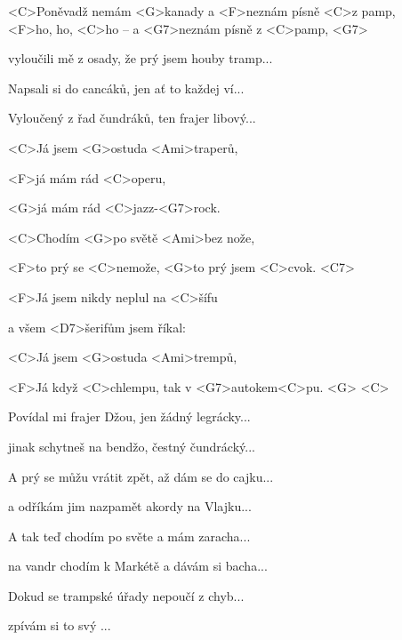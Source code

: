 

\zs
<C>Poněvadž nemám <G>kanady a <F>neznám písně <C>z pamp,
\\
<F>ho, ho, <C>ho -- a <G7>neznám písně z <C>pamp, 
<G7>

vyloučili mě z osady, že prý jsem houby tramp...

Napsali si do cancáků, jen ať to každej ví...

Vyloučený z řad čundráků, ten frajer libový...
\ks

\zr
<C>Já jsem <G>ostuda <Ami>traperů,

<F>já mám rád <C>operu,

<G>já mám rád <C>jazz-<G7>rock.

<C>Chodím <G>po světě <Ami>bez nože,

<F>to prý se <C>nemože, <G>to prý jsem <C>cvok. <C7>

<F>Já jsem nikdy neplul na <C>šífu

a všem <D7>šerifům jsem říkal: 

<C>Já jsem <G>ostuda <Ami>trempů,

<F>Já když <C>chlempu, tak v <G7>autokem<C>pu. <G> 
<C>
\kr

\zs
Povídal mi frajer Džou, jen žádný legrácky...

jinak schytneš na bendžo, čestný čundrácký...

A prý se můžu vrátit zpět, až dám se do cajku...

a odříkám jim nazpamět akordy na Vlajku...
\ks

\zr \kr

\zs
A tak teď chodím po světe a mám zaracha...

na vandr chodím k Markétě a dávám si bacha...

Dokud se trampské úřady nepoučí z chyb...

zpívám si to svý ...
\ks

\zr \kr

\kp





